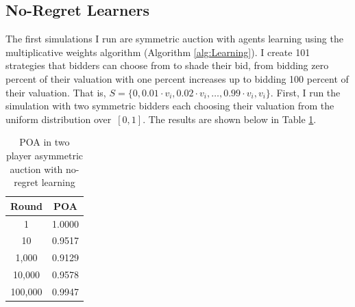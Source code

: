 \documentclass[12pt,twoside]{reedthesis}
\begin{document}
\subsection{No-Regret Learners}
The first simulations I run are symmetric auction with agents learning using the multiplicative weights algorithm (Algorithm \ref{alg:Learning}). I create 101 strategies that bidders can choose from to shade their bid, from bidding zero percent of their valuation with one percent increases up to bidding 100 percent of their valuation. That is, $S = \{ 0, 0.01 \cdot v_i, 0.02 \cdot v_i, \ldots, 0.99 \cdot v_i, v_i \}$. First, I run the simulation with two symmetric bidders each choosing their valuation from the uniform distribution over~$[0,1]$. The results are shown below in Table \ref{table:3}.

\begin{table}[h!]
	\begin{center}
		\begin{tabular}{ |c|c| }
			\hline
			Round & POA \\
			\hline
			1 & 1.0000 \\
			10 & 0.9517 \\
			1,000 & 0.9129 \\
			10,000 & 0.9578 \\
			100,000 & 0.9947 \\
			\hline
		\end{tabular}
		\caption{POA in two player asymmetric auction with no-regret learning}
		\label{table:3}
	\end{center} 
\end{table}
\end{document}
